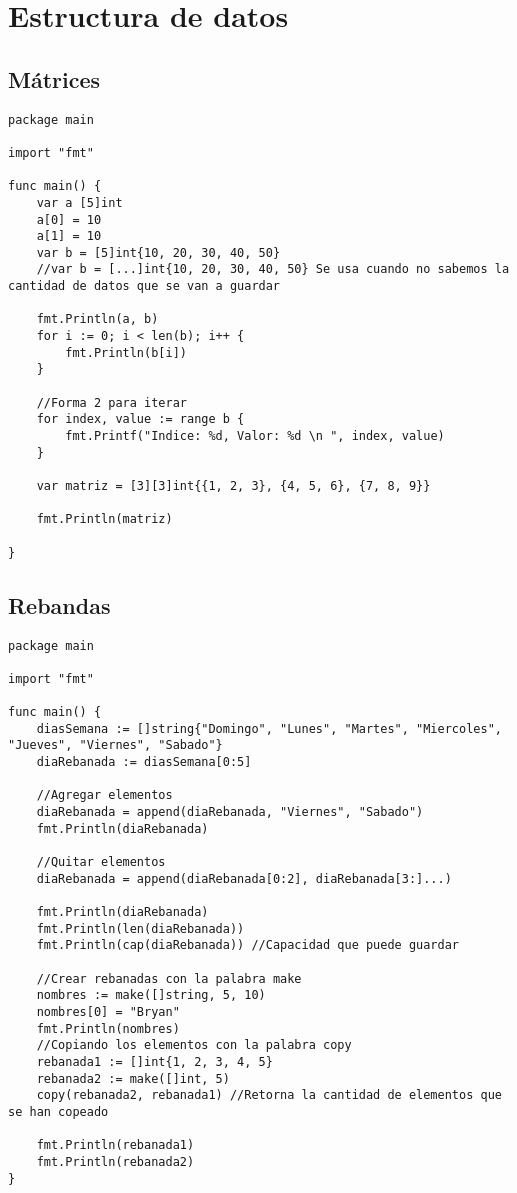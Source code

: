 \documentclass[10pt,a4paper]{article}
\begin{document}
\newpage
\section{Estructura de datos}
\subsection{Mátrices}

\begin{verbatim}
package main

import "fmt"

func main() {
	var a [5]int
	a[0] = 10
	a[1] = 10
	var b = [5]int{10, 20, 30, 40, 50}
	//var b = [...]int{10, 20, 30, 40, 50} Se usa cuando no sabemos la cantidad de datos que se van a guardar

	fmt.Println(a, b)
	for i := 0; i < len(b); i++ {
		fmt.Println(b[i])
	}

	//Forma 2 para iterar
	for index, value := range b {
		fmt.Printf("Indice: %d, Valor: %d \n ", index, value)
	}

	var matriz = [3][3]int{{1, 2, 3}, {4, 5, 6}, {7, 8, 9}}

	fmt.Println(matriz)

}
\end{verbatim}


\subsection{Rebandas}
\begin{verbatim}
package main

import "fmt"

func main() {
	diasSemana := []string{"Domingo", "Lunes", "Martes", "Miercoles", "Jueves", "Viernes", "Sabado"}
	diaRebanada := diasSemana[0:5]

	//Agregar elementos
	diaRebanada = append(diaRebanada, "Viernes", "Sabado")
	fmt.Println(diaRebanada)

	//Quitar elementos
	diaRebanada = append(diaRebanada[0:2], diaRebanada[3:]...)

	fmt.Println(diaRebanada)
	fmt.Println(len(diaRebanada))
	fmt.Println(cap(diaRebanada)) //Capacidad que puede guardar

	//Crear rebanadas con la palabra make
	nombres := make([]string, 5, 10)
	nombres[0] = "Bryan"
	fmt.Println(nombres)
	//Copiando los elementos con la palabra copy
	rebanada1 := []int{1, 2, 3, 4, 5}
	rebanada2 := make([]int, 5)
	copy(rebanada2, rebanada1) //Retorna la cantidad de elementos que se han copeado

	fmt.Println(rebanada1)
	fmt.Println(rebanada2)
}

\end{verbatim}
\end{document}
